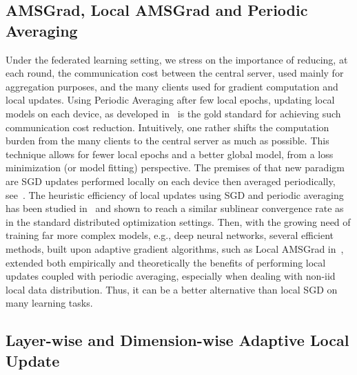 \documentclass[11pt]{article}
\begin{document}
\subsection{AMSGrad, Local AMSGrad and Periodic Averaging}
Under the federated learning setting, we stress on the importance of reducing, at each round, the communication cost between the central server, used mainly for aggregation purposes, and the many clients used for gradient computation and local updates.
Using Periodic Averaging after few local epochs, updating local models on each device, as developed in~\citet{mcmahan2017communication} is the gold standard for achieving such communication cost reduction.
Intuitively, one rather shifts the computation burden from the many clients to the central server as much as possible. 
This technique allows for fewer local epochs and a better global model, from a loss minimization (or model fitting) perspective.
The premises of that new paradigm are SGD updates performed locally on each device then averaged periodically, see~\citet{konevcny2016federated, zhou2017convergence}.
The heuristic efficiency of local updates using SGD and periodic averaging has been studied in~\citet{stich2018local,yu2019linear} and shown to reach a similar sublinear convergence rate as in the standard distributed optimization settings.
Then, with the growing need of training far more complex models, e.g., deep neural networks, several efficient methods, built upon adaptive gradient algorithms, such as Local AMSGrad in~\citet{chen2020toward}, extended both empirically and theoretically the benefits of performing local updates coupled with periodic averaging, especially when dealing with non-iid local data distribution. Thus, it can be a better alternative than local SGD on many learning tasks.



\subsection{Layer-wise and Dimension-wise Adaptive Local Update}
\end{document}
